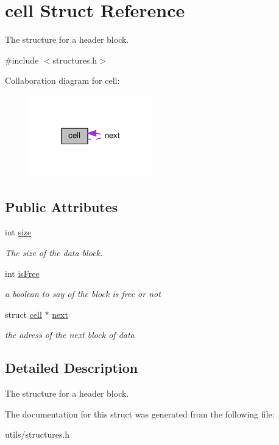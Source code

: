 \hypertarget{structcell}{}\section{cell Struct Reference}
\label{structcell}


The structure for a header block.  




{\ttfamily \#include $<$structures.\+h$>$}



Collaboration diagram for cell\+:
\nopagebreak
\begin{figure}[H]
\begin{center}
\leavevmode
\includegraphics[width=152pt]{structcell__coll__graph}
\end{center}
\end{figure}
\subsection*{Public Attributes}
\begin{DoxyCompactItemize}
\item 
\mbox{\label{structcell_afe50d62a094b090ae2817026c0830c60}} 
int \hyperlink{structcell_afe50d62a094b090ae2817026c0830c60}{size}
\begin{DoxyCompactList}\small\item\em The size of the data block. \end{DoxyCompactList}\item 
\mbox{\label{structcell_af0d53a07c723b6a5eddff646b4f2d09f}} 
int \hyperlink{structcell_af0d53a07c723b6a5eddff646b4f2d09f}{is\+Free}
\begin{DoxyCompactList}\small\item\em a boolean to say of the block is free or not \end{DoxyCompactList}\item 
\mbox{\label{structcell_a2f9c7a2efcdc3d026190df2056c614f3}} 
struct \hyperlink{structcell}{cell} $\ast$ \hyperlink{structcell_a2f9c7a2efcdc3d026190df2056c614f3}{next}
\begin{DoxyCompactList}\small\item\em the adress of the next block of data \end{DoxyCompactList}\end{DoxyCompactItemize}


\subsection{Detailed Description}
The structure for a header block. 

The documentation for this struct was generated from the following file\+:\begin{DoxyCompactItemize}
\item 
utils/structures.\+h\end{DoxyCompactItemize}
